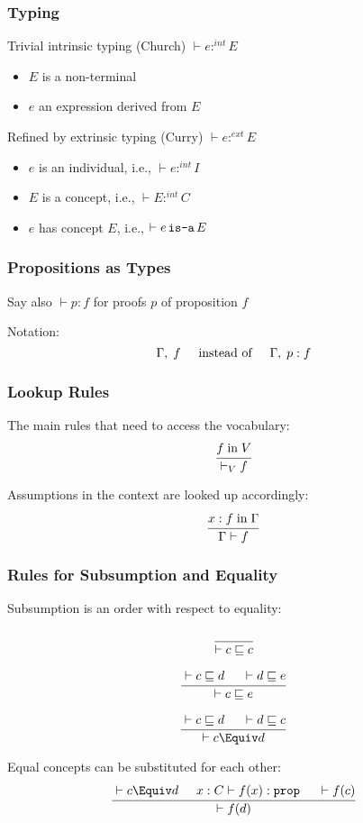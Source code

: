 \begin{frame}\frametitle{Typing}
Trivial intrinsic typing (Church) $\vdash e:^{int} E$
\begin{itemize}
\item $E$ is a non-terminal
\item $e$ an expression derived from $E$
\end{itemize}
\medskip

Refined by extrinsic typing (Curry) $\vdash e :^{ext} E$
\begin{itemize}
\item $e$ is an individual, i.e., $\vdash e :^{int} I$
\item $E$ is a concept, i.e., $\vdash E :^{int} C$
\item $e$ has concept $E$, i.e., $\vdash e \mathop{\texttt{is-a}} E$
\end{itemize}
\end{frame}

\begin{frame}\frametitle{Propositions as Types}
Say also $\vdash p:f$ for proofs $p$ of proposition $f$
\medskip

Notation:
\[\Gamma,\; f \hspace*{.5cm}\text{instead of} \hspace*{.5cm} \Gamma,\;p:f\]
\end{frame}

\begin{frame}\frametitle{Lookup Rules}
The main rules that need to access the vocabulary:
\[\cfrac{f\;\mathrm{in}\; V}{\vdash_V f}\,\]
\medskip

Assumptions in the context are looked up accordingly:
\[\cfrac{x:f\;\mathrm{in}\; \Gamma}{\Gamma\vdash f}\,\]
\end{frame}

\begin{frame}\frametitle{Rules for Subsumption and Equality}
Subsumption is an order with respect to equality:
\[\cfrac{}{\vdash c\sqsubseteq c}\,\]

\[\cfrac{\vdash c\sqsubseteq d \hspace*{.5cm} \vdash d\sqsubseteq e}{\vdash c\sqsubseteq e}\,\]

\[\rul{\vdash c\sqsubseteq d \tb \vdash d\sqsubseteq c}{\vdash c\Equiv d}\]

Equal concepts can be substituted for each other:
\[\rul{\vdash c\Equiv d\tb x:C\vdash f(x):\prop \tb \vdash f(c)}{\vdash f(d)}\]

\end{frame}

